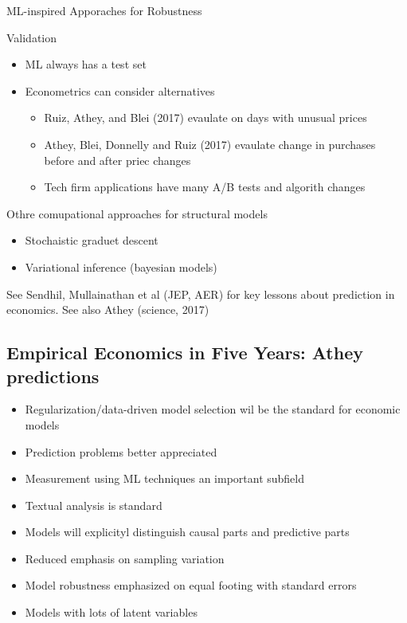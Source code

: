 \documentclass{article}
\begin{document}
ML-inspired Apporaches for Robustness

Validation
\begin{itemize}
    \item ML always has a test set
    \item Econometrics can consider alternatives
    \begin{itemize}
        \item Ruiz, Athey, and Blei (2017) evaulate on days with unusual prices
        \item Athey, Blei, Donnelly and Ruiz (2017) evaulate change in purchases before and after priec changes
        \item Tech firm applications  have many A/B tests and algorith changes
    \end{itemize}
\end{itemize}

Othre comupational approaches for structural models
\begin{itemize}
    \item Stochaistic graduet descent
    \item Variational inference (bayesian models)
\end{itemize}


See Sendhil, Mullainathan et al (JEP, AER) for key lessons about prediction in economics. See also Athey (science, 2017)

\subsection{Empirical Economics in Five Years: Athey predictions}

\begin{itemize}
    \item Regularization/data-driven model selection wil be the standard for economic models
    \item Prediction problems better appreciated
    \item Measurement using ML techniques an important subfield
    \item Textual analysis is standard
    \item Models will explicityl distinguish causal parts and predictive parts
    \item Reduced emphasis on sampling variation
    \item Model robustness emphasized on equal footing with standard errors
    \item Models with lots of latent variables
\end{itemize}
\end{document}

